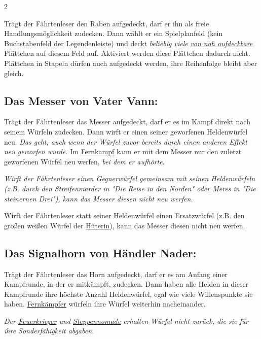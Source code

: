 \documentclass[10pt, a4paper, oneside]{book}
\newcommand{\fan}[1]{\textit{#1}}
\begin{document}
\begin{multicols*}{2}
\begin{nobgcolor}
Trägt der Fährtenleser den Raben aufgedeckt, darf er ihn als freie Handlungsmöglichkeit zudecken. Dann wählt er ein Spielplanfeld (kein Buchstabenfeld der Legendenleiste) und deckt \fan{beliebig viele} \hyperref[Aufdecken]{\fan{von nah aufdeckbare}} Plättchen auf diesem Feld auf.
\supercite{NH:Begleitheft}
Aktiviert werden diese Plättchen dadurch nicht. Plättchen in Stapeln dürfen auch aufgedeckt werden, ihre Reihenfolge bleibt aber gleich.
\supercite{BL_BdM:A3_en}


\subsection{Das Messer von Vater Vann:}

Trägt der Fährtenleser das Messer aufgedeckt, darf er es im Kampf direkt nach seinem Würfeln zudecken. Dann wirft er einen seiner geworfenen Heldenwürfel neu.
\supercite{NH:Begleitheft}
\fan{Das geht, auch wenn der Würfel zuvor bereits durch einen anderen Effekt neu geworfen wurde.} Im \hyperref[Fernkämpfer]{Fernkampf} kann er mit dem Messer nur den zuletzt geworfenen Würfel neu werfen,\supercite{DRidN:Begleitheft} \fan{bei dem er aufhörte}.


\fan{Wirft der Fährtenleser einen Gegnerwürfel gemeinsam mit seinen Heldenwürfeln (z.B. durch den Streifenmarder in "Die Reise in den Norden" oder Meres in "Die steinernen Drei"), kann das Messer diesen nicht neu werfen.}

Wirft der Fährtenleser statt seiner Heldenwürfel einen Ersatzwürfel (z.B. den großen weißen Würfel der \hyperref[Hüterin]{Hüterin}), kann das Messer diesen nicht neu werfen.
\supercite{5460}

\columnbreak

\subsection{Das Signalhorn von Händler Nader:}

Trägt der Fährtenleser das Horn aufgedeckt, darf er es am Anfang einer Kampfrunde, in der er mitkämpft, zudecken. Dann haben alle Helden in dieser Kampfrunde ihre höchste Anzahl Heldenwürfel, egal wie viele Willenspunkte sie haben. 
\hyperref[Fernkämpfer]{Fernkämpfer} würfeln ihre Würfel weiterhin nacheinander.
\supercite{NH:Begleitheft}

\fan{Der \hyperref[Feuerkrieger]{Feuerkrieger} und \hyperref[Steppennomade]{Steppennomade} erhalten Würfel nicht zurück, die sie für ihre Sonderfähigkeit abgaben.}


\end{nobgcolor}
\end{multicols*}
\end{document}
